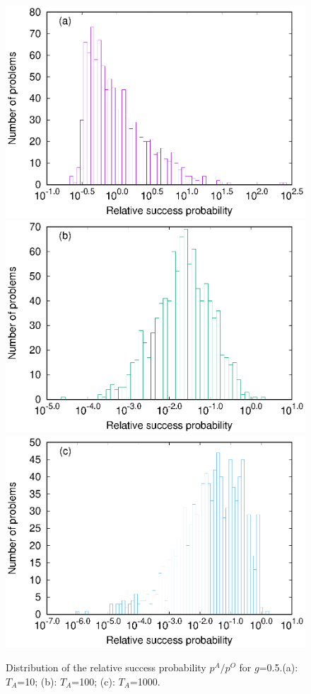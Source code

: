 \documentclass[../main.tex]{subfiles}
\begin{document}
\begin{figure}
\centering 
\includegraphics[scale=0.8]{A_T10_g0.eps}
\includegraphics[scale=0.8]{A_T100_g0.eps}
\includegraphics[scale=0.8]{A_T1000_g0.eps}
\caption{Distribution of the relative success probability $p^A/p^O$ for $g$=0.5.(a): $T_A$=10; (b): $T_A$=100; (c): $T_A$=1000.}
\label{fig:a10}
\end{figure}
\end{document}
